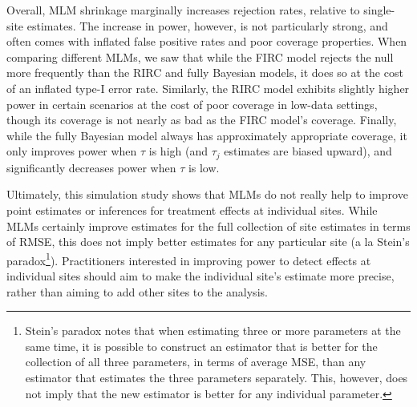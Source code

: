 \documentclass[]{article}
\begin{document}
Overall, MLM shrinkage marginally increases rejection rates, relative to single-site estimates.
The increase in power, however, is not particularly strong, and often comes with inflated false positive rates and poor coverage properties.
When comparing different MLMs, we saw that while the FIRC model rejects the null more frequently than the RIRC and fully Bayesian models, it does so at the cost of an inflated type-I error rate.
Similarly, the RIRC model exhibits slightly higher power in certain scenarios at the cost of poor coverage in low-data settings, though its coverage is not nearly as bad as the FIRC model's coverage.
Finally, while the fully Bayesian model always has approximately appropriate coverage, it only improves power when $\tau$ is high (and $\tau_j$ estimates are biased upward), and significantly decreases power when $\tau$ is low.

Ultimately, this simulation study shows that MLMs do not really help to improve point estimates or inferences for treatment effects at individual sites.
While MLMs certainly improve estimates for the full collection of site estimates in terms of RMSE, this does not imply better estimates for any particular site (a la Stein's paradox\footnote{Stein's paradox notes that when estimating three or more parameters at the same time, it is possible to construct an estimator that is better for the collection of all three parameters, in terms of average MSE, than any estimator that estimates the three parameters separately.
This, however, does not imply that the new estimator is better for any individual parameter.}).
Practitioners interested in improving power to detect effects at individual sites should aim to make the individual site's estimate more precise, rather than aiming to add other sites to the analysis.


	
\end{document}
